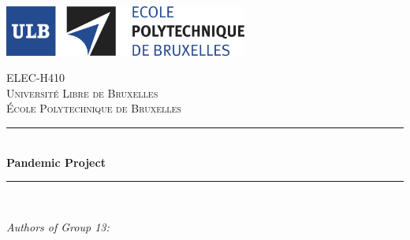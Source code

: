 \documentclass[a4paper, twoside, 12pt]{article}
\begin{document}
\begin{titlepage}

	\newcommand{\HRule}{\rule{\linewidth}{0.5mm}} %


	\includegraphics[width=8cm]{img/logo-polytech.jpg}\\[1cm] %


	\center %


	\textsc{\LARGE ELEC-H410}\\[1.5cm] %
	\textsc{\Large Université Libre de Bruxelles}\\[0.5cm] %
	\textsc{\large École Polytechnique de Bruxelles}\\[0.5cm] %

	\makeatletter
	\HRule \\[0.4cm]
	{ \huge \bfseries Pandemic Project}\\[0.4cm] %
	\HRule \\[1.5cm]


	\begin{minipage}{0.4\textwidth}
		\begin{flushleft} \large
			\emph{Authors of Group 13:}\\ %


\end{flushleft}
\end{minipage}
\end{titlepage}
\end{document}
